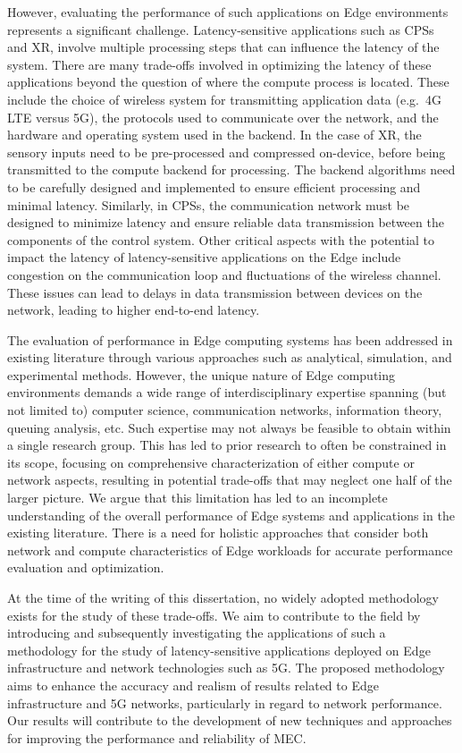 However, evaluating the performance of such applications on Edge environments represents a significant challenge.
Latency-sensitive applications such as \glspl{CPS} and \gls{XR}, involve multiple processing steps that can influence the latency of the system.
There are many trade-offs involved in optimizing the latency of these applications beyond the question of where the compute process is located. 
These include the choice of wireless system for transmitting application data (e.g.\ 4G \gls{LTE} versus 5G), the protocols used to communicate over the network, and the hardware and operating system used in the backend.
In the case of \gls{XR}, the sensory inputs need to be pre-processed and compressed on-device, before being transmitted to the compute backend for processing.
The backend algorithms need to be carefully designed and implemented to ensure efficient processing and minimal latency. 
Similarly, in \glspl{CPS}, the communication network must be designed to minimize latency and ensure reliable data transmission between the components of the control system.
Other critical aspects with the potential to impact the latency of latency-sensitive applications on the Edge include congestion on the communication loop and fluctuations of the wireless channel.
These issues can lead to delays in data transmission between devices on the network, leading to higher end-to-end latency.

The evaluation of performance in Edge computing systems has been addressed in existing literature through various approaches such as analytical, simulation, and experimental methods.
However, the unique nature of Edge computing environments demands a wide range of interdisciplinary expertise spanning (but not limited to) computer science, communication networks, information theory, queuing analysis, etc.
Such expertise may not always be feasible to obtain within a single research group.
This has led to prior research to often be constrained in its scope, focusing on comprehensive characterization of either compute or network aspects, resulting in potential trade-offs that may neglect one half of the larger picture.
We argue that this limitation has led to an incomplete understanding of the overall performance of Edge systems and applications in the existing literature.
There is a need for holistic approaches that consider both network and compute characteristics of Edge workloads for accurate performance evaluation and optimization.

At the time of the writing of this dissertation, no widely adopted methodology exists for the study of these trade-offs.
We aim to contribute to the field by introducing and subsequently investigating the applications of such a methodology for the study of latency-sensitive applications deployed on Edge infrastructure and network technologies such as 5G.
The proposed methodology aims to enhance the accuracy and realism of results related to Edge infrastructure and 5G networks, particularly in regard to network performance.
Our results will contribute to the development of new techniques and approaches for improving the performance and reliability of \gls{MEC}.

